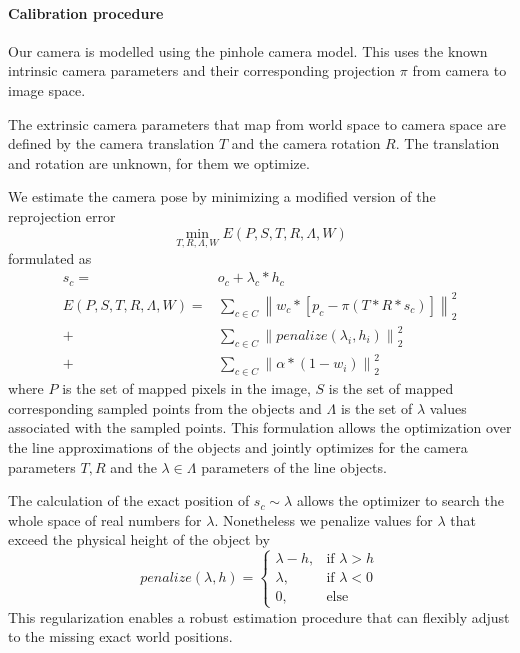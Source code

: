 
\paragraph{Calibration procedure}
  
Our camera is modelled using the pinhole camera model. 
This uses the known intrinsic camera parameters and their corresponding projection $\pi$ from camera to image space.

The extrinsic camera parameters that map from world space to camera space are defined by the camera translation $T$ and the camera rotation $R$.
The translation and rotation are unknown, for them we optimize. 

We estimate the camera pose by minimizing a modified version of the reprojection error 
\begin{equation}
  \min_{T, R, \Lambda, W} E(P, S, T, R, \Lambda, W) 
\end{equation}
formulated as
\begin{equation}
  \begin{split}
    s_c =& o_c + \lambda_c * h_c \\
  E(P, S, T, R, \Lambda, W ) =& 
  \sum_{c \in C} 
  \left\lVert 
    w_c * [ p_c - \pi(T * R * s_c) ]
  \right\rVert_2^2 \\ 
  +& 
  \sum_{c \in C} 
  \left\lVert 
  penalize(\lambda_i, h_i)
  \right\rVert_2^2 \\ 
  +& 
  \sum_{c \in C} 
  \left\lVert 
  \alpha * (1 - w_i)
  \right\rVert_2^2 
\end{split}
\label{eq:reprojection_error}
\end{equation}
where $P$ is the set of mapped pixels in the image, $S$ is the set of mapped corresponding sampled points from the objects and $\Lambda$ is the set of $\lambda$ values associated with the sampled points.
This formulation allows the optimization over the line approximations of the objects and jointly optimizes for the camera parameters $T, R$ and the $\lambda \in \Lambda$ parameters of the line objects.

The calculation of the exact position of $s_c \sim \lambda$ allows the optimizer to search the whole space of real numbers for $\lambda$.
Nonetheless we penalize values for $\lambda$ that exceed the physical height of the object by 
\begin{equation}
    penalize(\lambda, h) =
    \begin{cases}
      \lambda - h,& \text{if } \lambda > h\\
      \lambda,    & \text{if } \lambda < 0\\
      0,    & \text{else}
    \end{cases} 
\end{equation}
This regularization enables a robust estimation procedure that can flexibly adjust to the missing exact world positions.

